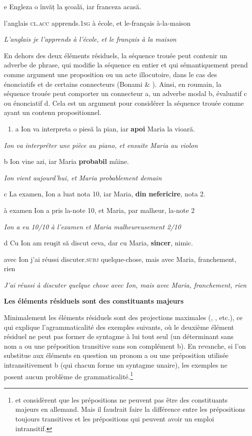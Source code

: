   e  Engleza o învăț la şcoală, iar franceza acasă.

    l'anglais \textsc{cl.acc} apprends.\textsc{1sg} à école, et le-français à-la-maison

    \textit{L'anglais je l'apprends à l'école, et le français à la maison}

En dehors des deux éléments résiduels, la séquence trouée peut contenir un adverbe de phrase, qui modifie la séquence en entier et qui sémantiquement prend comme argument une proposition ou un acte illocutoire, dans le cas des énonciatifs et de certains connecteurs (Bonami \& \citet{Godard2005}). Ainsi, en roumain, la séquence trouée peut comporter un connecteur a, un adverbe modal b, évaluatif c ou énonciatif d. Cela est un argument pour considérer la séquence trouée comme ayant un contenu propositionnel. 


\begin{enumerate}
\item \label{bkm:Ref289361673}a  Ion va interpreta o piesă la pian, iar \textbf{apoi} Maria la vioară.


\end{enumerate}
{\itshape
Ion va interpréter une pièce au piano, et ensuite Maria au violon}

 b  Ion vine azi, iar Maria \textbf{probabil} mâine.

{\itshape
Ion vient aujourd'hui, et Maria probablement demain}

  c  La examen, Ion a luat nota 10, iar Maria, \textbf{din nefericire}, nota 2.

    à examen Ion a pris la-note 10, et Maria, par malheur, la-note 2

{\itshape
Ion a eu 10/10 à l'examen et Maria malheureusement 2/10 } 

  d  Cu Ion am reuşit să discut ceva, dar cu Maria, \textbf{sincer}, nimic.

    avec Ion j'ai réussi discuter.\textsc{subj} quelque-chose, mais avec Maria, franchement, rien

    \textit{J'ai réussi à discuter quelque chose avec Ion, mais avec Maria, franchement, rien}

{\bfseries
Les éléments résiduels sont des constituants majeurs}

Minimalement les éléments résiduels sont des projections maximales (\citet{Sag1976}, \citet{Hartmann2000}, etc.), ce qui explique l'agrammaticalité des exemples suivants, où le deuxième élément résiduel ne peut pas former de syntagme à lui tout seul (un déterminant sans nom a ou une préposition transitive sans son complément b). En revanche, si l'on substitue aux éléments en question un pronom a ou une préposition utilisée intransitivement b (qui chacun forme un syntagme unaire), les exemples ne posent aucun problème de grammaticalité.\footnote{\citet{Hartmann2000} et \citet{Repp2009} considèrent que les prépositions ne peuvent pas être des constituants majeurs en allemand. Mais il faudrait faire la différence entre les prépositions toujours transitives et les prépositions qui peuvent avoir un emploi intransitif.}  


